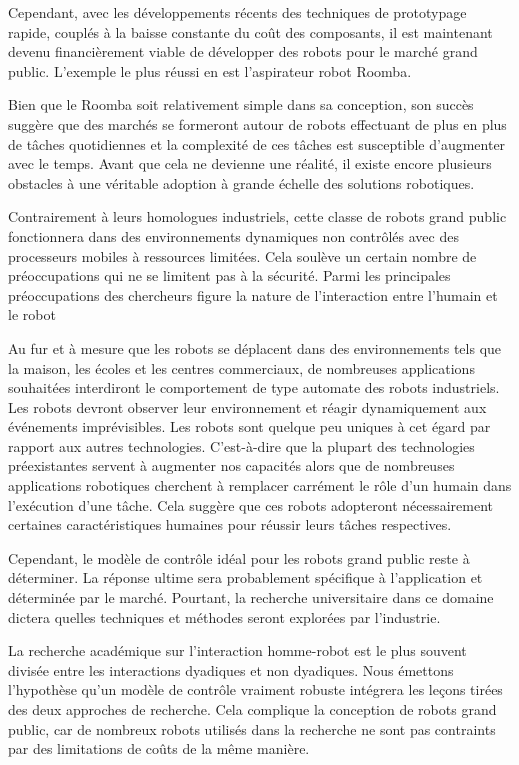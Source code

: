 \documentclass[conference]{IEEEtran}
\begin{document}
Cependant, avec les développements récents des techniques de prototypage rapide, couplés à la baisse constante du coût des composants, il est maintenant devenu financièrement viable de développer des robots pour le marché grand public. L'exemple le plus réussi en est l'aspirateur robot Roomba\cite{b2}.

Bien que le Roomba soit relativement simple dans sa conception, son succès suggère que des marchés se formeront autour de robots effectuant de plus en plus de tâches quotidiennes et la complexité de ces tâches est susceptible d'augmenter avec le temps. Avant que cela ne devienne une réalité, il existe encore plusieurs obstacles à une véritable adoption à grande échelle des solutions robotiques.

Contrairement à leurs homologues industriels, cette classe de robots grand public fonctionnera dans des environnements dynamiques non contrôlés avec des processeurs mobiles à ressources limitées. Cela soulève un certain nombre de préoccupations qui ne se limitent pas à la sécurité. Parmi les principales préoccupations des chercheurs figure la nature de l'interaction entre l'humain et le robot\cite{b3}

Au fur et à mesure que les robots se déplacent dans des environnements tels que la maison, les écoles et les centres commerciaux, de nombreuses applications souhaitées interdiront le comportement de type automate des robots industriels\cite{b4}. Les robots devront observer leur environnement et réagir dynamiquement aux événements imprévisibles. Les robots sont quelque peu uniques à cet égard par rapport aux autres technologies. C'est-à-dire que la plupart des technologies préexistantes servent à augmenter nos capacités alors que de nombreuses applications robotiques cherchent à remplacer carrément le rôle d'un humain dans l'exécution d'une tâche. Cela suggère que ces robots adopteront nécessairement certaines caractéristiques humaines pour réussir leurs tâches respectives.

Cependant, le modèle de contrôle idéal pour les robots grand public reste à déterminer. La réponse ultime sera probablement spécifique à l'application et déterminée par le marché. Pourtant, la recherche universitaire dans ce domaine dictera quelles techniques et méthodes seront explorées par l'industrie.

La recherche académique sur l'interaction homme-robot est le plus souvent divisée entre les interactions dyadiques et non dyadiques\cite{b3}. Nous émettons l'hypothèse qu'un modèle de contrôle vraiment robuste intégrera les leçons tirées des deux approches de recherche. Cela complique la conception de robots grand public, car de nombreux robots utilisés dans la recherche ne sont pas contraints par des limitations de coûts de la même manière.
\end{document}
